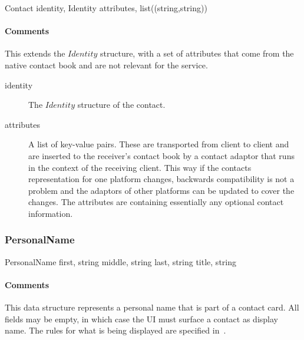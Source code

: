 \documentclass[a4paper,10pt]{article}
\begin{document}
\begin{verbbox}
Contact
{
  identity, Identity
  attributes, list((string,string))
}
\end{verbbox}
\begin{center}
\theverbbox
\end{center}

\begin{inparaitem}[ ]
 \item \infrastructure
\end{inparaitem}

\paragraph*{Comments}
This extends the $Identity$ structure, with a set of attributes that come from the native contact book and are not relevant for the service.

\SpecialItem
\begin{description}
 \item[identity] The $Identity$ structure of the contact.
 \item[attributes] A list of key-value pairs. These are transported from client to client and are inserted to the receiver's contact book by a contact adaptor that runs in the 
context of the receiving client. This way if the contacts representation for one platform changes, backwards compatibility is not a problem and the adaptors of other platforms can 
be updated to cover the changes. The attributes are containing essentially any optional contact information.
\end{description}

\subsubsection{PersonalName}

\begin{verbbox}
PersonalName
{
  first, string
  middle, string
  last, string
  title, string
}
\end{verbbox}
\begin{center}
\theverbbox
\end{center}

\begin{inparaitem}[ ]
 \item \infrastructure
\end{inparaitem}

\paragraph*{Comments}
This data structure represents a personal name that is part of a contact card. All fields may be empty, in which case the UI must surface a contact as display name. The rules 
for what is being displayed are specified in~\cite{flow_spec}.
\end{document}
